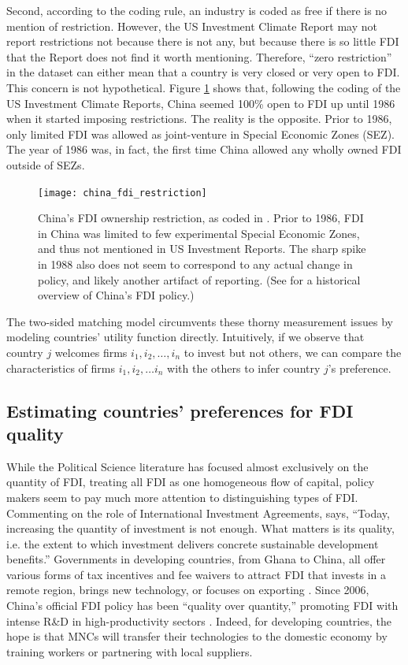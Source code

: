 Second, according to the coding rule, an industry is coded as free if there is
no mention of restriction. However, the US Investment Climate Report may not
report restrictions not because there is not any, but because there is so little
FDI that the Report does not find it worth mentioning. Therefore, ``zero
restriction'' in the dataset can either mean that a country is very closed or
very open to FDI. This concern is not hypothetical. Figure
\ref{fig:china_fdi_restriction} shows that, following the coding of the US
Investment Climate Reports, China seemed 100\% open to FDI up until 1986 when it
started imposing restrictions. The reality is the opposite. Prior to 1986, only
limited FDI was allowed as joint-venture in Special Economic Zones (SEZ). The
year of 1986 was, in fact, the first time China allowed any wholly owned FDI
outside of SEZs.

\begin{figure}[!ht] \centering
  \texttt{[image: china\_fdi\_restriction]}
  \caption[China's FDI ownership restriction.]{China's FDI ownership
    restriction, as coded in \citet{Pandya2010}. Prior to 1986, FDI in China was
    limited to few experimental Special Economic Zones, and thus not mentioned
    in US Investment Reports. The sharp spike in 1988 also does not seem to
    correspond to any actual change in policy, and likely another artifact of
    reporting. (See \citet{Zebregs2002} for a historical overview of China's FDI
    policy.)}
  \label{fig:china_fdi_restriction}
\end{figure}

The two-sided matching model circumvents these thorny measurement issues by
modeling countries' utility function directly. Intuitively, if we observe that
country $j$ welcomes firms $i_1, i_2, \dots, i_n$ to invest but not others, we
can compare the characteristics of firms $i_1, i_2, \dots i_n$ with the others
to infer country $j$'s preference.

\subsection{Estimating countries' preferences for FDI quality}

While the Political Science literature has focused almost exclusively on the
quantity of FDI, treating all FDI as one homogeneous flow of capital, policy
makers seem to pay much more attention to distinguishing types of FDI.
Commenting on the role of International Investment Agreements,
\citet{UNCTAD2015} says, ``Today, increasing the quantity of investment is not
enough. What matters is its quality, i.e. the extent to which investment
delivers concrete sustainable development benefits.'' Governments in developing
countries, from Ghana to China, all offer various forms of tax incentives and
fee waivers to attract FDI that invests in a remote region, brings new
technology, or focuses on exporting \citep{Ricupero2000}. Since 2006, China's
official FDI policy has been ``quality over quantity,'' promoting FDI with
intense R\&D in high-productivity sectors \citep{Guangzhou2011}. Indeed, for
developing countries, the hope is that MNCs will transfer their technologies to
the domestic economy by training workers or partnering with local suppliers.

